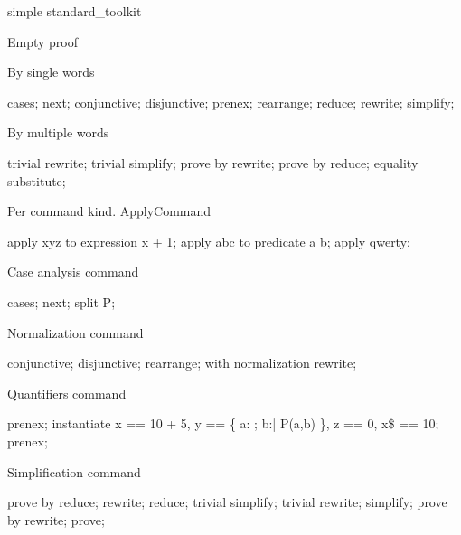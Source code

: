 \begin{zsection}
   \SECTION simple \parents standard\_toolkit
\end{zsection}

Empty proof

\begin{zproof}[emptyProof]
\end{zproof}

By single words

\begin{zproof}[singleWord]
cases;
next;
conjunctive;
disjunctive;
prenex;
rearrange;
reduce;
rewrite;
simplify;
\end{zproof}

By multiple words

\begin{zproof}[multipleWords]
trivial rewrite;
trivial simplify;
prove by
  rewrite;
prove by
    reduce;     %
equality substitute;
\end{zproof}

Per command kind. ApplyCommand

\begin{zproof}[applyWordComplex]
apply xyz to expression x + 1;
apply abc to predicate a \in b;
apply qwerty;
\end{zproof}

Case analysis command

\begin{zproof}[caseAnalysisCmd]
cases;
next;
split P;
\end{zproof}

Normalization command

\begin{zproof}[normCmd]
conjunctive;    %
disjunctive;
rearrange;
with normalization rewrite;
\end{zproof}

Quantifiers command

\begin{zproof}[qntCmd]
prenex;
instantiate x == 10 + 5, y == \{ a: \nat; b:\nat | P(a,b) \},
    z == 0, x\$ == 10;  %
prenex;
\end{zproof}

Simplification command

\begin{zproof}[simpCmd]
prove by reduce;
rewrite;
reduce;
trivial simplify;
trivial rewrite;
simplify;
prove by rewrite;
prove;
\end{zproof}

